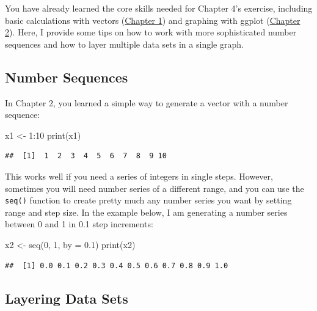 \documentclass[
]{book}
\newenvironment{Shaded}{\begin{snugshade}}{\end{snugshade}}
\newcommand{\AttributeTok}[1]{\textcolor[rgb]{0.77,0.63,0.00}{#1}}
\newcommand{\DecValTok}[1]{\textcolor[rgb]{0.00,0.00,0.81}{#1}}
\newcommand{\FloatTok}[1]{\textcolor[rgb]{0.00,0.00,0.81}{#1}}
\newcommand{\FunctionTok}[1]{\textcolor[rgb]{0.00,0.00,0.00}{#1}}
\newcommand{\NormalTok}[1]{#1}
\newcommand{\OtherTok}[1]{\textcolor[rgb]{0.56,0.35,0.01}{#1}}
\newcommand{\SpecialCharTok}[1]{\textcolor[rgb]{0.00,0.00,0.00}{#1}}
\begin{document}
You have already learned the core skills needed for Chapter 4's exercise, including basic calculations with vectors (\href{what-evolution-is.html\#practical-skills-getting-started-with-r}{Chapter 1}) and graphing with ggplot (\href{evidence-for-evolution.html\#practical-skills}{Chapter 2}). Here, I provide some tips on how to work with more sophisticated number sequences and how to layer multiple data sets in a single graph.

\hypertarget{number-sequences-1}{%
\subsection{Number Sequences}\label{number-sequences-1}}

In Chapter 2, you learned a simple way to generate a vector with a number sequence:

\begin{Shaded}
\begin{Highlighting}[]
\NormalTok{x1 }\OtherTok{\textless{}{-}} \DecValTok{1}\SpecialCharTok{:}\DecValTok{10}
\FunctionTok{print}\NormalTok{(x1)}
\end{Highlighting}
\end{Shaded}

\begin{verbatim}
##  [1]  1  2  3  4  5  6  7  8  9 10
\end{verbatim}

This works well if you need a series of integers in single steps. However, sometimes you will need number series of a different range, and you can use the \texttt{seq()} function to create pretty much any number series you want by setting range and step size. In the example below, I am generating a number series between 0 and 1 in 0.1 step increments:

\begin{Shaded}
\begin{Highlighting}[]
\NormalTok{x2 }\OtherTok{\textless{}{-}} \FunctionTok{seq}\NormalTok{(}\DecValTok{0}\NormalTok{, }\DecValTok{1}\NormalTok{, }\AttributeTok{by =} \FloatTok{0.1}\NormalTok{)}
\FunctionTok{print}\NormalTok{(x2)}
\end{Highlighting}
\end{Shaded}

\begin{verbatim}
##  [1] 0.0 0.1 0.2 0.3 0.4 0.5 0.6 0.7 0.8 0.9 1.0
\end{verbatim}

\hypertarget{layering-data-sets}{%
\subsection{Layering Data Sets}\label{layering-data-sets}}
\end{document}
